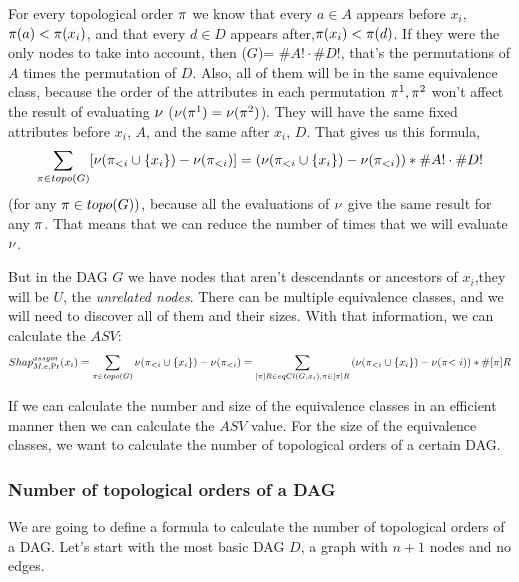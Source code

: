 For every topological order $\pi$ we know that every $a \in A$ appears before $x_i$, $\pi(a) < \pi(x_i)$, and that every $d \in D$ appears after,$\pi(x_i) < \pi(d)$. If they were the only nodes to take into account, then \numTopo($G$)= \#$A! \cdot \#D!$, that's the permutations of $A$ times the permutation of $D$. Also, all of them will  be in the same equivalence class, because the order of the attributes in each permutation $\pi^1, \pi^2$ won't affect the result of evaluating $\nu$ ($\nu(\pi^1) = \nu(\pi^2)$). They will have the same fixed attributes before $x_i$, $A$,  and the same after $x_i$, $D$. That gives us this formula,  $$\sum_{\pi \in topo(G)} [\nu(\pi_{<i} \cup \{x_i\}) - \nu(\pi_{<i})] = ( \nu(\pi_{<i} \cup \{x_i\}) - \nu(\pi_{<i}) ) * \#A! \cdot \#D!$$ (for any $\pi \in topo(G))$, because all the evaluations of $\nu$ give the same result for any $\pi$. That means that we can reduce the number of times that we will evaluate $\nu$.

But in the DAG $G$ we have nodes that aren't descendants or ancestors  of $x_i$,they will be $U$, the \emph{unrelated nodes}. There can be multiple equivalence classes, and we will need to discover all of them and their sizes. With that information, we can calculate the $ASV$: $$Shap^{assym}_{M,e,\Pr}(x_i) = \sum_{\pi \in topo(G)} \nu(\pi_{<i} \cup \{x_i\}) - \nu(\pi_{<i}) = \sum_{[\pi]R \in eqCl(G, x_i), \pi \in [\pi]R} \left(\nu(\pi_{<i} \cup \{x_i\}) - \nu(\pi{<i}) \right)* \#[\pi]R$$

If we can calculate the number and size of the equivalence classes in an efficient manner then we can calculate the $ASV$ value. For the size of the equivalence classes, we want to calculate the number of topological orders of a certain DAG. 

\subsubsection{Number of topological orders of a DAG} %
\label{Number Of Toposorts}

We are going to define a formula to calculate the number of topological orders of a DAG. Let's start with the most basic DAG $D$, a graph with $n+1$ nodes and no edges. 

